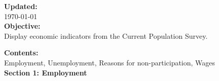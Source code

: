 \documentclass{report}
\begin{document}
\begin{minipage}{0.64\textwidth}
\vspace{-20pt}
\textbf{Updated:} \\
\today\\

\textbf{Objective:} \\ Display economic indicators from the Current Population Survey.

\end{minipage}\hspace{35.2pt}
\begin{minipage}{0.32\textwidth} 	\vspace{-25pt}

\end{minipage}

\vspace{3mm}
\textbf{Contents:} \\ \indent Employment, Unemployment, Reasons for non-participation, Wages\\

\vspace{6mm}
\noindent \textcolor{black!60}{\huge \textbf{Section 1: Employment}}

\vspace{5mm}
\end{document}
